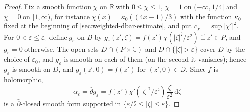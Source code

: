\begin{proof}
Fix a smooth function $\chi$ on $\mathbb R$ with $0\le\chi\le1$, $\chi=1$ on $(-\infty,1/4]$ and $\chi=0$ on $[1,\infty)$, for instance $\chi(x)=\kappa_0((4x-1)/3)$ with the function $\kappa_0$ fixed at the beginning of \cref{sec:weighted-dbar-estimate}, and put $c_\chi=\sup|\chi'|^2$. For $0<\varepsilon\le\varepsilon_0$ define $g_\varepsilon$ on $D$ by $g_\varepsilon(z',\zeta)=f(z')\chi(|\zeta|^2/\varepsilon^2)$ if $z'\in P$, and $g_\varepsilon=0$ otherwise. The open sets $D\cap(P\times\mathbb C)$ and $D\cap\{|\zeta|>\varepsilon\}$ cover $D$ by the choice of $\varepsilon_0$, and $g_\varepsilon$ is smooth on each of them (on the second it vanishes); hence $g_\varepsilon$ is smooth on $D$, and $g_\varepsilon(z',0)=f(z')$ for $(z',0)\in D$. Since $f$ is holomorphic,
\[
 \alpha_\varepsilon=\bar\partial g_\varepsilon=f(z')\chi'(|\zeta|^2/\varepsilon^2)
                    \frac{\zeta}{\varepsilon^2}\,\mathrm d\bar\zeta
\]
is a $\bar\partial$-closed smooth form supported in $\{\varepsilon/2\le|\zeta|\le\varepsilon\}$.


\end{proof}
